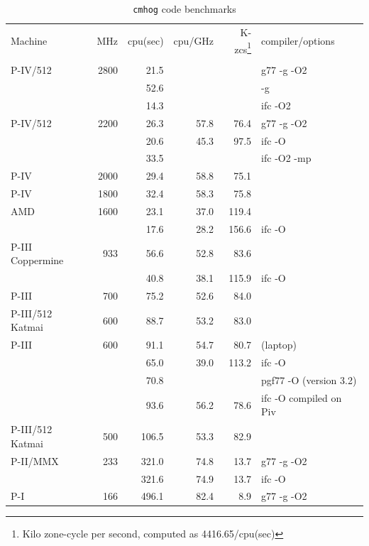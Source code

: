 \documentclass[10pt,dvips]{article}
\begin{document}
{\begin{table}[htbp]
\centering
\medskip
\caption{{\tt cmhog} code benchmarks}
\begin{tabular}{|l|r|r|r|r|l|} \hline
Machine & MHz  	      
	& cpu(sec) 
	& cpu/GHz 
	& K-zcs\footnote{Kilo zone-cycle per second, computed as 4416.65/cpu(sec)}
	& compiler/options \\ 
&&&&&  \\ \hline
P-IV/512	& 2800	&	 21.5 &       &       & g77 -g -O2 \\  %
                &       &        52.6 &       &       & -g \\
                &       &        14.3 &       &       & ifc -O2 \\    
P-IV/512	& 2200	&	 26.3 & 57.8  &  76.4 & g77 -g -O2 \\  %
                &       &        20.6 & 45.3  &  97.5 & ifc -O \\
		&       &        33.5 &       &       & ifc -O2 -mp \\
P-IV		& 2000  &	 29.4 & 58.8  &  75.1 &  \\  %
P-IV		& 1800  &	 32.4 & 58.3  &  75.8 &  \\  %
AMD 		& 1600  &        23.1 & 37.0  & 119.4 & \\ %
                &       &        17.6 & 28.2  & 156.6 & ifc -O \\
P-III Coppermine & 933   &	 56.6 & 52.8  &  83.6 & \\ %
                 &       &       40.8 & 38.1  & 115.9 & ifc -O \\
P-III		& 700   &	 75.2 & 52.6  &  84.0 & \\ %
P-III/512 Katmai & 600	&	 88.7 & 53.2  &  83.0 &  \\ %
P-III		& 600	&	 91.1 & 54.7  &  80.7 & (laptop) \\ %
 		& 	&	 65.0 & 39.0  & 113.2 & ifc -O \\
		&	&	 70.8 &       &       & pgf77 -O (version 3.2) \\
		&	&	 93.6 & 56.2  &  78.6 & ifc -O compiled on Piv \\
P-III/512 Katmai & 500  &	106.5 & 53.3  &  82.9 & \\  %
P-II/MMX        & 233   &       321.0 & 74.8  &  13.7 & g77 -g -O2 \\ %
		&	&	321.6 & 74.9  &  13.7 & ifc -O \\
P-I             & 166   &       496.1 & 82.4  &   8.9 & g77 -g -O2 \\ %

\end{tabular}
\end{table}}
\end{document}

